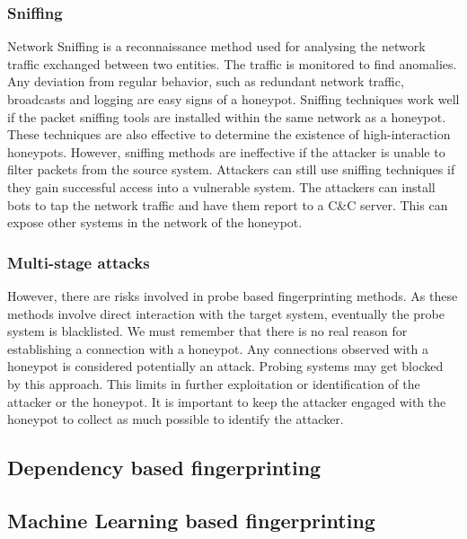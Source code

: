 \documentclass[letterpaper, 10 pt, conference]{ieeeconf}  %
\begin{document}
\subsubsection{Sniffing}
Network Sniffing is a reconnaissance method used for analysing the network traffic exchanged between two entities. The traffic is monitored to find anomalies. Any deviation from regular behavior, such as redundant network traffic, broadcasts and logging are easy signs of a honeypot. Sniffing techniques work well if the packet sniffing tools are installed within the same network as a honeypot. These techniques are also effective to determine the existence of high-interaction honeypots. However, sniffing methods are ineffective if the attacker is unable to filter packets from the source system. Attackers can still use sniffing techniques if they gain successful access into a vulnerable system. The attackers can install bots to tap the network traffic and have them report to a C&C server. This can expose other systems in the network of the honeypot. 

\newline
\subsubsection{Multi-stage attacks}

\newline
However, there are risks involved in probe based fingerprinting methods. As these methods involve direct interaction with the target system, eventually the probe system is blacklisted. We must remember that there is no real reason for establishing a connection with a honeypot. Any connections observed with a honeypot is considered potentially an attack. Probing systems may get blocked by this approach. This limits in further exploitation or identification of the attacker or the honeypot. It is important to keep the attacker engaged with the honeypot to collect as much possible to identify the attacker. 


\subsection{Dependency based fingerprinting}


\subsection{Machine Learning based fingerprinting}
\end{document}
